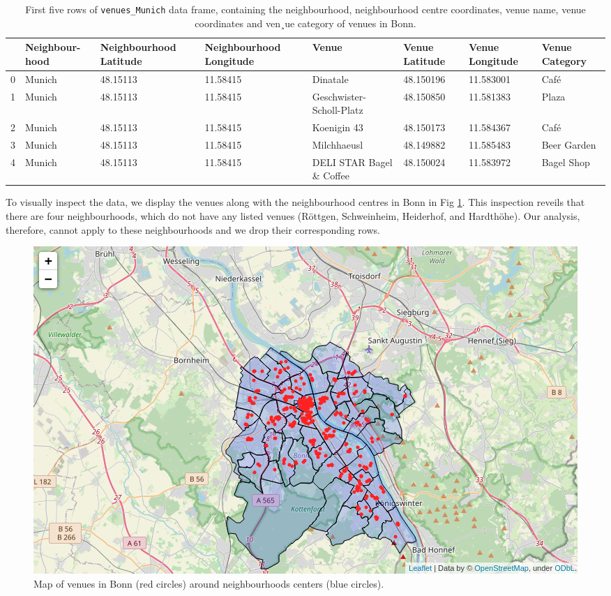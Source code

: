 \documentclass[UKenglish]{scrreprt}
\begin{document}
\begin{table}
	\caption{First five rows of \texttt{venues\_Munich} data frame, containing the neighbourhood, neighbourhood centre coordinates, venue name, venue coordinates and ven¸ue category of venues in Bonn.}
	\label{tab:venues_Munich}
\begin{tabular}{lp{1.5cm}p{2.2cm}p{2.2cm}p{1.5cm}p{1.5cm}p{1.5cm}p{1.5cm}}
	\toprule
	{} & Neighbour-hood & Neighbourhood Latitude &  Neighbourhood Longitude &                     Venue &  Venue Latitude &  Venue Longitude & Venue Category \\
	\midrule
	0 &       Munich &               48.15113 &                11.58415 &                  Dinatale &       48.150196 &        11.583001 &           Café \\
	1 &       Munich &               48.15113 &                11.58415 &  Geschwister-Scholl-Platz &       48.150850 &        11.581383 &          Plaza \\
	2 &       Munich &               48.15113 &                11.58415 &               Koenigin 43 &       48.150173 &        11.584367 &           Café \\
	3 &       Munich &               48.15113 &                11.58415 &               Milchhaeusl &       48.149882 &        11.585483 &    Beer Garden \\
	4 &       Munich &               48.15113 &                11.58415 &  DELI STAR Bagel \& Coffee &       48.150024 &        11.583972 &     Bagel Shop \\
	\bottomrule
\end{tabular}
\end{table}

To visually inspect the data, we display the venues along with the neighbourhood centres in Bonn in Fig \ref{fig:map venues_bonn}. This inspection reveils that there are four neighbourhoods, which do not have any listed venues (Röttgen, Schweinheim, Heiderhof, and Hardthöhe). Our analysis, therefore, cannot apply to these neighbourhoods and we drop their corresponding rows.

\begin{figure}[htbp]
	\centering
	\includegraphics[width=\textwidth]{Figs/Map_Bonn_venues.png}
	\caption{Map of venues in Bonn (red circles) around neighbourhoods centers (blue circles).}
	\label{fig:map venues_bonn}
\end{figure}
\end{document}

